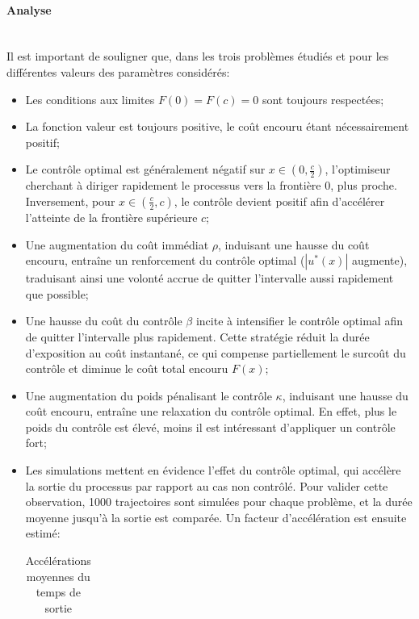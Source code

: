 \paragraph{Analyse}\phantom{}\\
Il est important de souligner que, dans les trois problèmes étudiés et pour les différentes valeurs des paramètres considérés:
\begin{itemize}
    \item Les conditions aux limites $F(0)=F(c)=0$ sont toujours respectées;
    \item La fonction valeur est toujours positive, le coût encouru étant nécessairement positif;
    \item Le contrôle optimal est généralement négatif sur \( x \in \left(0, \frac{c}{2}\right) \), l'optimiseur cherchant à diriger rapidement le processus vers la frontière \( 0 \), plus proche. Inversement, pour \( x \in \left(\frac{c}{2}, c\right) \), le contrôle devient positif afin d'accélérer l'atteinte de la frontière supérieure \( c \);
    \item Une augmentation du coût immédiat $\rho$, induisant une hausse du coût encouru, entraîne un renforcement du contrôle optimal ($|u^*(x)|$ augmente), traduisant ainsi une volonté accrue de quitter l'intervalle aussi rapidement que possible;
    \item Une hausse du coût du contrôle $\beta$ incite à intensifier le contrôle optimal afin de quitter l'intervalle plus rapidement. Cette stratégie réduit la durée d'exposition au coût instantané, ce qui compense partiellement le surcoût du contrôle et diminue le coût total encouru $F(x)$;
    \item Une augmentation du poids pénalisant le contrôle $\kappa$, induisant une hausse du coût encouru, entraîne une relaxation du contrôle optimal. En effet, plus le poids du contrôle est élevé, moins il est intéressant d'appliquer un contrôle fort;
    \item Les simulations mettent en évidence l'effet du contrôle optimal, qui accélère la sortie du processus par rapport au cas non contrôlé. Pour valider cette observation, 1000 trajectoires sont simulées pour chaque problème, et la durée moyenne jusqu'à la sortie est comparée. Un facteur d'accélération est ensuite estimé:
    \begin{table}[htb]
        \centering
        \caption{Accélérations moyennes du temps de sortie}\label{tab:acceleration_results}
        \renewcommand{\arraystretch}{1.1}
        \begin{tabular}{||c|c||}

\end{tabular}
\end{table}
\end{itemize}
